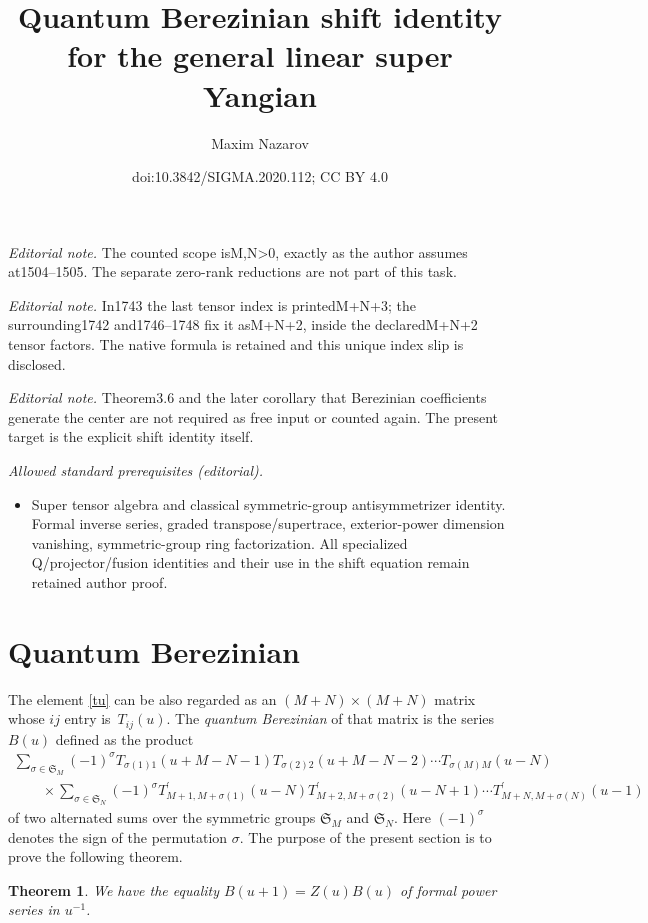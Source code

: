 \documentclass[10pt,a4paper]{amsart}
\title{Quantum Berezinian shift identity for the general linear super Yangian}
\author{Maxim Nazarov}
\date{doi:10.3842/SIGMA.2020.112; CC BY 4.0}
\numberwithin{equation}{section}
\newtheorem{Theorem}{Theorem}[section]
\def\1{^{-1}}
\def\si{\sigma}
\def\Sym{\mathfrak{S}}
\def\TP{T^{\prime}}
\begin{document}
\maketitle
\noindent\textit{Editorial note.} The counted scope isM,N>0, exactly as the author assumes at1504–1505. The separate zero-rank reductions are not part of this task.\par\medskip
\noindent\textit{Editorial note.} In1743 the last tensor index is printedM+N+3; the surrounding1742 and1746–1748 fix it asM+N+2, inside the declaredM+N+2 tensor factors. The native formula is retained and this unique index slip is disclosed.\par\medskip
\noindent\textit{Editorial note.} Theorem3.6 and the later corollary that Berezinian coefficients generate the center are not required as free input or counted again. The present target is the explicit shift identity itself.\par\medskip
\noindent\textit{Allowed standard prerequisites (editorial).}\begin{itemize}
\item Super tensor algebra and classical symmetric-group antisymmetrizer identity. Formal inverse series, graded transpose/supertrace, exterior-power dimension vanishing, symmetric-group ring factorization. All specialized Q/projector/fusion identities and their use in the shift equation remain retained author proof.
\end{itemize}\medskip
\section{Quantum Berezinian}\label{sec:3}

The element \eqref{tu} can be also regarded as an $(M+N)\times(M+N)$ matrix
whose $ij$ entry is~$T_{ij}(u) $.
The \emph{quantum Berezinian} of that matrix is the series $B(u)$ defined
as the product
\begin{gather*}
 \sum_{\si\in\Sym_M} (-1)^\si T_{\si(1)1}(u+M-N-1) T_{\si(2)2}(u+M-N-2)\cdots T_{\si(M)M}(u-N)
\\
\qquad{}\times \sum_{\si\in\Sym_N} (-1)^\si
\TP_{M+1,M+\si(1)}(u-N)
\TP_{M+2,M+\si(2)}(u-N+1)\cdots
\TP_{M+N,M+\si(N)}(u-1)
\end{gather*}
of two alternated sums over the symmetric groups $\Sym_M$ and $\Sym_N $.
Here $(-1)^\si$ denotes the sign of the permutation $\si $.
The purpose of the present section is to prove the following theorem.

\begin{Theorem}\label{BZ}
We have the equality $B(u+1)=Z(u) B(u)$ of formal power series in $u\1$.
\end{Theorem}
\end{document}
